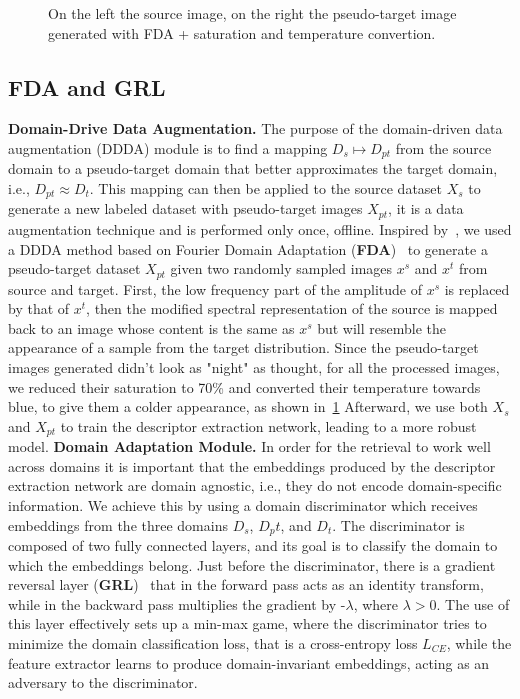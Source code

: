\documentclass[10pt,twocolumn,letterpaper]{article}
\begin{document}
\begin{figure}[b]
    \centering
    \caption{On the left the source image, on the right the pseudo-target image generated with FDA + saturation and temperature convertion.}
    \label{fig:fda_show}
\end{figure}

\subsection{FDA and GRL}
\textbf{Domain-Drive Data Augmentation.}
The purpose of the domain-driven data augmentation (DDDA) module is to find a mapping $D_s \mapsto D_{pt}$ from the source domain to a pseudo-target domain that better approximates the target domain, i.e., $D_{pt} \approx D_t$. This mapping can then be applied to the source dataset $X_s$ to generate a new labeled dataset with pseudo-target images $X_{pt}$, it is a data augmentation technique and is performed only once, offline. Inspired by~\cite{fda, adageo}, we used a DDDA method based on Fourier Domain Adaptation (\textbf{FDA})~\cite{fda} to generate a pseudo-target dataset $X_{pt}$ given two randomly sampled images $x^s$ and $x^t$ from source and target. First, the low frequency part of the amplitude of $x^s$ is replaced by that of $x^t$, then the modified spectral representation of the source is mapped back to an image whose content is the same as $x^s$ but will resemble the appearance of a sample from the target distribution.
Since the pseudo-target images generated didn't look as "night" as thought, for all the processed images, we reduced their saturation to 70\% and converted their temperature towards blue, to give them a colder appearance, as shown in~\cref{fig:fda_show}
Afterward, we use both $X_s$ and $X_{pt}$ to train the descriptor extraction network, leading to a more robust model.
\newline
\textbf{Domain Adaptation Module.}
In order for the retrieval to work well across domains it is important that the embeddings produced by the descriptor extraction network are domain agnostic, i.e., they do not encode domain-specific information. We achieve this by using a domain discriminator which receives embeddings from the three domains $D_s$, $D_pt$, and $D_t$. The discriminator is composed of two fully connected layers, and its goal is to classify the domain to which the embeddings belong. Just before the discriminator, there is a gradient reversal layer (\textbf{GRL})~\cite{grl} that in the forward pass acts as an identity transform, while in the backward pass multiplies the gradient by -$\lambda$, where $\lambda > 0$. The use of this layer effectively sets up a min-max game, where the discriminator tries to minimize the domain classification loss, that is a cross-entropy loss $L_{CE}$, while the feature extractor learns to produce domain-invariant embeddings, acting as an adversary to the discriminator.
\end{document}
